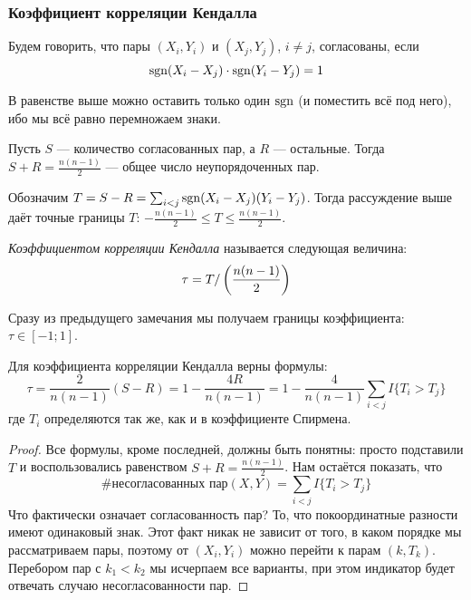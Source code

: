 \subsubsection*{Коэффициент корреляции Кендалла}

\begin{definition}
	Будем говорить, что пары $(X_i, Y_i)$ и $(X_j, Y_j)$, $i \neq j$, согласованы, если
	\[
		\operatorname{sgn}(X_i - X_j) \cdot \operatorname{sgn}(Y_i - Y_j) = 1
	\]
\end{definition}

\begin{note}
	В равенстве выше можно оставить только один $\operatorname{sgn}$ (и поместить всё под него), ибо мы всё равно перемножаем знаки.
\end{note}

\begin{note}
	Пусть $S$ --- количество согласованных пар, а $R$ --- остальные. Тогда $S + R = \frac{n(n - 1)}{2}$ --- общее число неупорядоченных пар.
	
	Обозначим $T = S - R = \sum_{i < j} \operatorname{sgn}(X_i - X_j)(Y_i - Y_j)$. Тогда рассуждение выше даёт точные границы $T$: $-\frac{n(n - 1)}{2} \le T \le \frac{n(n - 1)}{2}$.
\end{note}

\begin{definition}
	\textit{Коэффициентом корреляции Кендалла} называется следующая величина:
	\[
		\tau = T / \left(\frac{n(n - 1)}{2}\right)
	\]
\end{definition}

\begin{note}
	Сразу из предыдущего замечания мы получаем границы коэффициента: $\tau \in [-1; 1]$.
\end{note}

\begin{proposition}
	Для коэффициента корреляции Кендалла верны формулы:
	\[
		\tau = \frac{2}{n(n - 1)}(S - R) = 1 - \frac{4R}{n(n - 1)} = 1 - \frac{4}{n(n - 1)}\sum_{i < j} I\{T_i > T_j\}
	\]
	где $T_i$ определяются так же, как и в коэффициенте Спирмена.
\end{proposition}

\begin{proof}
	Все формулы, кроме последней, должны быть понятны: просто подставили $T$ и воспользовались равенством $S + R = \frac{n(n - 1)}{2}$. Нам остаётся показать, что
	\[
		\text{\#несогласованных пар}(X, Y) = \sum_{i < j} I\{T_i > T_j\}
	\]
	Что фактически означает согласованность пар? То, что покоординатные разности имеют одинаковый знак. Этот факт никак не зависит от того, в каком порядке мы рассматриваем пары, поэтому от $(X_i, Y_i)$ можно перейти к парам $(k, T_k)$. Перебором пар с $k_1 < k_2$ мы исчерпаем все варианты, при этом индикатор будет отвечать случаю несогласованности пар.
\end{proof}

